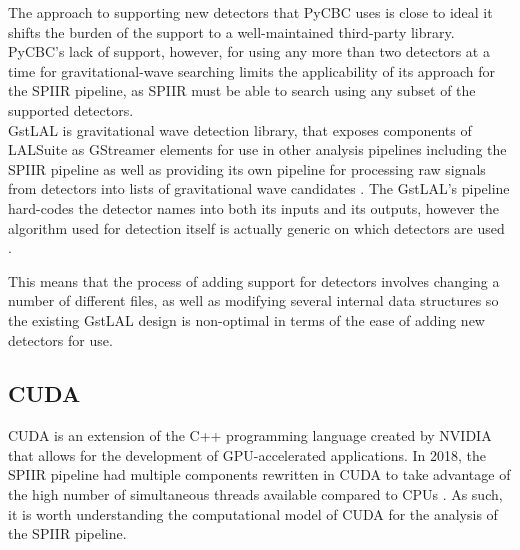 \documentclass{article}
\begin{document}
The approach to supporting new detectors that PyCBC uses is close to ideal \textemdash{} it shifts the burden of the support to a well-maintained third-party library.
PyCBC's lack of support, however, for using any more than two detectors at a time for gravitational-wave searching limits the applicability of its approach for the SPIIR pipeline, as SPIIR must be able to search using any subset of the supported detectors.
\\

GstLAL is gravitational wave detection library, that exposes components of LALSuite \cite{lalsuite} as GStreamer elements for use in other analysis pipelines \textemdash{} including the SPIIR pipeline \textemdash{} as well as providing its own pipeline for processing raw signals from detectors into lists of gravitational wave candidates \cite{gstlal_docs}.
The GstLAL's pipeline hard-codes the detector names into both its inputs and its outputs, however the algorithm used for detection itself is actually generic on which detectors are used \cite{gstlal_paper, gstlal_coinc}.

This means that the process of adding support for detectors involves changing a number of different files, as well as modifying several internal data structures \cite{messick} \textemdash{} so the existing GstLAL design is non-optimal in terms of the ease of adding new detectors for use.

\subsection{CUDA} \label{sec:lit_review:cuda}

CUDA \cite{CUDA} is an extension of the C++ programming language created by NVIDIA that allows for the development of GPU-accelerated applications.
In 2018, the SPIIR pipeline had multiple components rewritten in CUDA to take advantage of the high number of simultaneous threads available compared to CPUs \cite{SPIIRGPU2018}.
As such, it is worth understanding the computational model of CUDA for the analysis of the SPIIR pipeline.
\end{document}
